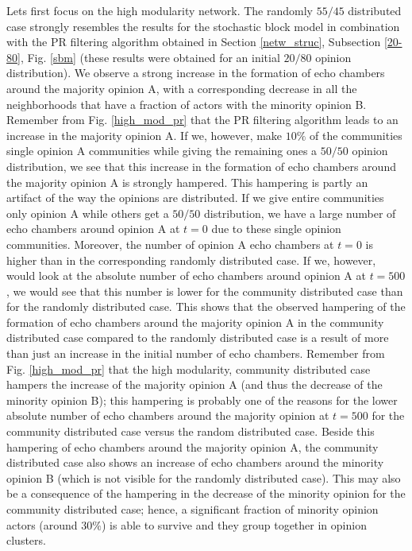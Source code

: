 \documentclass[11 pt , letterpaper , twoside , openright]{book}
\begin{document}
Lets first focus on the high modularity network. The randomly $55/45$ distributed case strongly resembles the results for the stochastic block model in combination with the PR filtering algorithm obtained in Section \ref{netw_struc}, Subsection \ref{20-80}, Fig. \ref{sbm} (these results were obtained for an initial $20/80$ opinion distribution). We observe a strong increase in the formation of echo chambers around the majority opinion A, with a corresponding decrease in all the neighborhoods that have a fraction of actors with the minority opinion B. Remember from Fig. \ref{high_mod_pr} that the PR filtering algorithm leads to an increase in the majority opinion A. If we, however, make $10 \%$ of the communities single opinion A communities while giving the remaining ones a $50/50$ opinion distribution, we see that this increase in the formation of echo chambers around the majority opinion A is strongly hampered. This hampering is partly an artifact of the way the opinions are distributed. If we give entire communities only opinion A while others get a $50/50$ distribution, we have a large number of echo chambers around opinion A at $t=0$ due to these single opinion communities. Moreover, the number of opinion A echo chambers at $t=0$ is higher than in the corresponding randomly distributed case. If we, however, would look at the absolute number of echo chambers around opinion A at $t=500$, we would see that this number is lower for the community distributed case than for the randomly distributed case. This shows that the observed hampering of the formation of echo chambers around the majority opinion A in the community distributed case compared to the randomly distributed case is a result of more than just an increase in the initial number of echo chambers. Remember from Fig. \ref{high_mod_pr} that the high modularity, community distributed case hampers the increase of the majority opinion A (and thus the decrease of the minority opinion B); this hampering is probably one of the reasons for the lower absolute number of echo chambers around the majority opinion at $t=500$ for the community distributed case versus the random distributed case. Beside this hampering of echo chambers around the majority opinion A, the community distributed case also shows an increase of echo chambers around the minority opinion B (which is not visible for the randomly distributed case). This may also be a consequence of the hampering in the decrease of the minority opinion for the community distributed case; hence, a significant fraction of minority opinion actors (around $30 \%$) is able to survive and they group together in opinion clusters.  %
\end{document}
